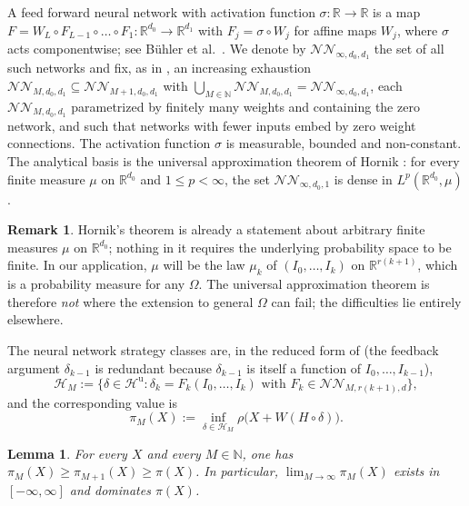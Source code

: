 \documentclass[11pt,a4paper]{report}
\numberwithin{equation}{chapter}
\theoremstyle{plain}
\newtheorem{lemma}[proposition]{Lemma}
\theoremstyle{definition}
\newtheorem{remark}[proposition]{Remark}
\newcommand{\R}{\mathbb{R}}
\newcommand{\N}{\mathbb{N}}
\newcommand{\HH}{\mathcal{H}}
\newcommand{\Hu}{\mathcal{H}^{\mathrm{u}}}
\newcommand{\NNet}{\mathcal{N\!N}}
\begin{document}
A feed forward neural network with activation function $\sigma\colon\R\to\R$ is a map $F=W_L\circ F_{L-1}\circ\dots\circ F_1\colon\R^{d_0}\to\R^{d_1}$ with $F_j=\sigma\circ W_j$ for affine maps $W_j$, where $\sigma$ acts componentwise; see B\"uhler et al.\ \cite[Definition~2]{buehler}. We denote by $\NNet_{\infty,d_0,d_1}$ the set of all such networks and fix, as in \cite[Section~4.1]{buehler}, an increasing exhaustion $\NNet_{M,d_0,d_1}\subseteq\NNet_{M+1,d_0,d_1}$ with $\bigcup_{M\in\N}\NNet_{M,d_0,d_1}=\NNet_{\infty,d_0,d_1}$, each $\NNet_{M,d_0,d_1}$ parametrized by finitely many weights and containing the zero network, and such that networks with fewer inputs embed by zero weight connections. The activation function $\sigma$ is measurable, bounded and non-constant. The analytical basis is the universal approximation theorem of Hornik \cite[Theorems~1 and~2]{hornik}: for every finite measure $\mu$ on $\R^{d_0}$ and $1\le p<\infty$, the set $\NNet_{\infty,d_0,1}$ is dense in $L^p(\R^{d_0},\mu)$.

\begin{remark}\label{rem:hornik-general}
    Hornik's theorem is already a statement about arbitrary finite measures $\mu$ on $\R^{d_0}$; nothing in it requires the underlying probability space to be finite. In our application, $\mu$ will be the law $\mu_k$ of $(I_0,\dots,I_k)$ on $\R^{r(k+1)}$, which is a probability measure for any $\Omega$. The universal approximation theorem is therefore \emph{not} where the extension to general $\Omega$ can fail; the difficulties lie entirely elsewhere.
\end{remark}

The neural network strategy classes are, in the reduced form of \cite[proof of Proposition~4.3]{buehler} (the feedback argument $\delta_{k-1}$ is redundant because $\delta_{k-1}$ is itself a function of $I_0,\dots,I_{k-1}$),
\[
    \HH_M:=\bigl\{\delta\in\Hu:\delta_k=F_k(I_0,\dots,I_k)\text{ with }F_k\in\NNet_{M,r(k+1),d}\bigr\},
\]
and the corresponding value is
\begin{equation}\label{eq:piM}
    \pi_M(X):=\inf_{\delta\in\HH_M}\rho\bigl(X+W(H\circ\delta)\bigr).
\end{equation}

\begin{lemma}\label{lem:monotone}
    For every $X$ and every $M\in\N$, one has $\pi_M(X)\ge\pi_{M+1}(X)\ge\pi(X)$. In particular, $\lim_{M\to\infty}\pi_M(X)$ exists in $[-\infty,\infty]$ and dominates $\pi(X)$.
\end{lemma}
\end{document}
